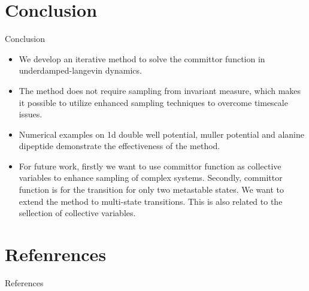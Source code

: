 \documentclass{beamer}
\begin{document}
\section{Conclusion}
\begin{frame}{Conclusion}
    \begin{itemize}
        \item We develop an iterative method to solve the committor function in underdamped-langevin dynamics.
        \item The method does not require sampling from invariant measure, which makes it possible to utilize enhanced sampling techniques to overcome timescale issues.
        \item Numerical examples on 1d double well potential, muller potential and alanine dipeptide demonstrate the effectiveness of the method.
        \item For future work, firstly we want to use committor function as collective variables to enhance sampling of complex systems. 
        Secondly, committor function is for the transition for only two metastable states. We want to extend the method to multi-state transitions. This is also related to the sellection of collective variables.
    \end{itemize}
    
\end{frame}

\section*{Refenrences}

\begin{frame}[allowframebreaks]{References}
    \footnotesize

\end{frame}
\end{document}

